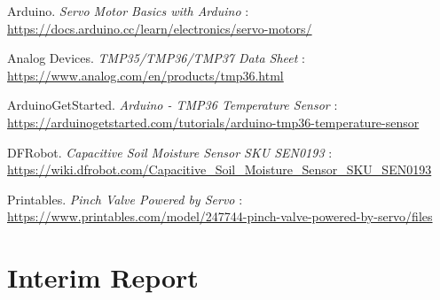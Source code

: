 \documentclass[a4paper,11pt]{article}
\begin{document}
\newpage
\appendix
\begin{thebibliography}{9}

Arduino. \textit{Servo Motor Basics with Arduino} : \\
\url{https://docs.arduino.cc/learn/electronics/servo-motors/}

Analog Devices. \textit{TMP35/TMP36/TMP37 Data Sheet} : \\
\url{https://www.analog.com/en/products/tmp36.html} 

ArduinoGetStarted. \textit{Arduino - TMP36 Temperature Sensor} : \\
\url{https://arduinogetstarted.com/tutorials/arduino-tmp36-temperature-sensor}

DFRobot. \textit{Capacitive Soil Moisture Sensor SKU SEN0193} : \\
\url{https://wiki.dfrobot.com/Capacitive_Soil_Moisture_Sensor_SKU_SEN0193}

Printables. \textit{Pinch Valve Powered by Servo} : \\
\url{https://www.printables.com/model/247744-pinch-valve-powered-by-servo/files}

\end{thebibliography}

\section{Interim Report}
\end{document}

